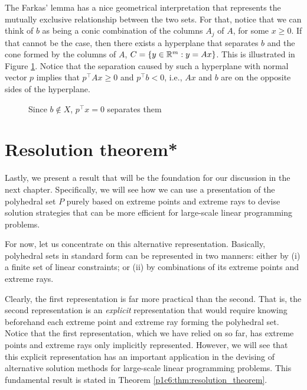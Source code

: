 The Farkas' lemma has a nice geometrical interpretation that represents the mutually exclusive relationship between the two sets. For that, notice that we can think of $b$ as being a conic combination of the columns $A_j$ of $A$, for some $x \ge 0$. If that cannot be the case, then there exists a hyperplane that separates $b$ and the cone formed by the columns of $A$, $C=\left\{ y \in \mathbb{R}^m : y = Ax \right \}$. This is illustrated in Figure \ref{p1c6:fig:farkas}. Notice that the separation caused by such a hyperplane with normal vector $p$ implies that $p^\top Ax \geq 0$ and $p^\top b < 0$, i.e., $Ax$ and $b$ are on the opposite sides of the hyperplane. 

\begin{figure}[h]
	\caption{Since $b \not\in X$, $p^\top x=0$ separates them} \label{p1c6:fig:farkas}	
\end{figure}


\section{Resolution theorem*}

Lastly, we present a result that will be the foundation for our discussion in the next chapter. Specifically, we will see how we can use a presentation of the polyhedral set $P$ purely based on extreme points and extreme rays to devise solution strategies that can be more efficient for large-scale linear programming problems. 

For now, let us concentrate on this alternative representation. Basically, polyhedral sets in standard form can be represented in two manners: either by (i) a finite set of linear constraints; or (ii) by combinations of its extreme points and extreme rays.

Clearly, the first representation is far more practical than the second. That is, the second representation is an \emph{explicit} representation that would require knowing beforehand each extreme point and extreme ray forming the polyhedral set. Notice that the first representation, which we have relied on so far, has extreme points and extreme rays only implicitly represented. However, we will see that this explicit representation has an important application in the devising of alternative solution methods for large-scale linear programming problems. This fundamental result is stated in Theorem \ref{p1c6:thm:resolution_theorem}. 

